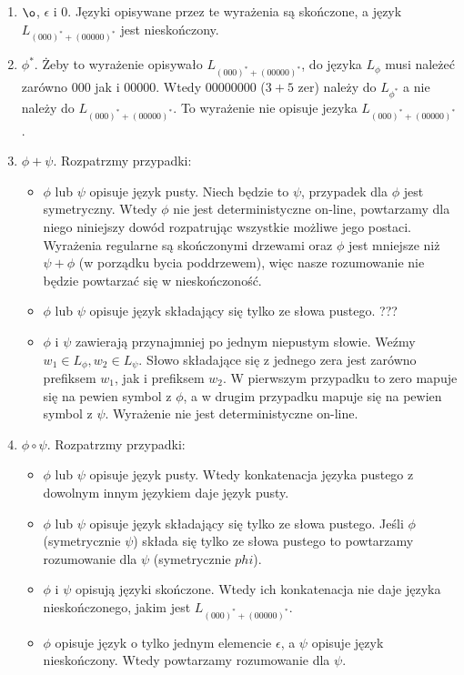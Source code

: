 \documentclass[a4paper]{article}
\begin{document}
\begin{enumerate}
\item $\o$, $\epsilon$ i $0$. Języki opisywane przez te wyrażenia są skończone, a język $L_{(000)^* + (00000)^*}$ jest nieskończony.
\item $\phi^*$. Żeby to wyrażenie opisywało $L_{(000)^* + (00000)^*}$, do języka $L_{\phi}$ musi należeć zarówno $000$ jak i $00000$. Wtedy $00000000$ ($3+5$ zer) należy do $L_{\phi^*}$ a nie należy do $L_{(000)^* + (00000)^*}$. To wyrażenie nie opisuje jezyka $L_{(000)^* + (00000)^*}$.
\item $\phi + \psi$. Rozpatrzmy przypadki:
  \begin{itemize}
    \item $\phi$ lub $\psi$ opisuje język pusty. Niech będzie to $\psi$, przypadek dla $\phi$ jest symetryczny. Wtedy $\phi$ nie jest deterministyczne on-line, powtarzamy dla niego niniejszy dowód rozpatrując wszystkie możliwe jego postaci. Wyrażenia regularne są skończonymi drzewami oraz $\phi$ jest mniejsze niż $\psi + \phi$ (w porządku bycia poddrzewem), więc nasze rozumowanie nie będzie powtarzać się w nieskończoność.
    \item $\phi$ lub $\psi$ opisuje język składający się tylko ze słowa pustego. ???
    \item $\phi$ i $\psi$ zawierają przynajmniej po jednym niepustym słowie. Weźmy $w_1 \in L_{\phi}, w_2 \in L_{\psi}$. Słowo składające się z jednego zera jest zarówno prefiksem $w_1$, jak i prefiksem $w_2$. W pierwszym przypadku to zero mapuje się na pewien symbol z $\phi$, a w drugim przypadku mapuje się na pewien symbol z $\psi$. Wyrażenie nie jest deterministyczne on-line.
  \end{itemize}
\item $\phi \circ \psi$. Rozpatrzmy przypadki:
  \begin{itemize}
  \item $\phi$ lub $\psi$ opisuje język pusty. Wtedy konkatenacja języka pustego z dowolnym innym językiem daje język pusty.
    \item $\phi$ lub $\psi$ opisuje język składający się tylko ze słowa pustego. Jeśli $\phi$ (symetrycznie $\psi$) składa się tylko ze słowa pustego to powtarzamy rozumowanie dla $\psi$ (symetrycznie $phi$).
    \item $\phi$ i $\psi$ opisują języki skończone. Wtedy ich konkatenacja nie daje języka nieskończonego, jakim jest $L_{(000)^* + (00000)^*}$.
    \item $\phi$ opisuje język o tylko jednym elemencie $\epsilon$, a $\psi$ opisuje język nieskończony. Wtedy powtarzamy rozumowanie dla $\psi$.

\end{itemize}
\end{enumerate}
\end{document}
